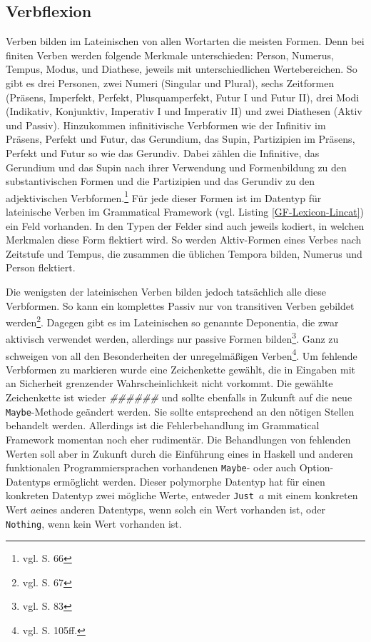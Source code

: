 \subsection{Verbflexion}
\label{subsec:verb}
Verben bilden im Lateinischen von allen Wortarten die meisten Formen. Denn bei finiten Verben werden folgende Merkmale unterschieden: Person, Numerus, Tempus, Modus, und Diathese, jeweils mit unterschiedlichen Wertebereichen. So gibt es drei Personen, zwei Numeri (Singular und Plural), sechs Zeitformen (Präsens, Imperfekt, Perfekt, Plusquamperfekt, Futur I und Futur II), drei Modi (Indikativ, Konjunktiv, Imperativ I und Imperativ II) und zwei Diathesen (Aktiv und Passiv). Hinzukommen infinitivische Verbformen wie der Infinitiv im Präsens, Perfekt und Futur, das Gerundium, das Supin, Partizipien im Präsens, Perfekt und Futur so wie das Gerundiv. Dabei zählen die Infinitive, das Gerundium und das Supin nach ihrer Verwendung und Formenbildung zu den substantivischen Formen und die Partizipien und das Gerundiv zu den adjektivischen Verbformen.\footnote{vgl. \cite{BAYER-LINDAUER1994} S. 66} Für jede dieser Formen ist im Datentyp für lateinische Verben im Grammatical Framework (vgl. Listing \ref{GF-Lexicon-Lincat}) ein Feld vorhanden. In den Typen der Felder sind auch jeweils kodiert, in welchen Merkmalen diese Form flektiert wird. So werden Aktiv-Formen eines Verbes nach Zeitstufe und Tempus, die zusammen die üblichen Tempora bilden, Numerus und Person flektiert.  \par
Die wenigsten der lateinischen Verben bilden jedoch tatsächlich alle diese Verbformen. So kann ein komplettes Passiv nur von transitiven Verben gebildet werden\footnote{vgl. \cite{BAYER-LINDAUER1994} S. 67}. Dagegen gibt es im Lateinischen so genannte Deponentia, die zwar aktivisch verwendet werden, allerdings nur passive Formen bilden\footnote{vgl. \cite{BAYER-LINDAUER1994} S. 83}. Ganz zu schweigen von all den Besonderheiten der unregelmäßigen Verben\footnote{vgl. \cite{BAYER-LINDAUER1994} S. 105ff.}. Um fehlende Verbformen zu markieren wurde eine Zeichenkette gewählt, die in Eingaben mit an Sicherheit grenzender Wahrscheinlichkeit nicht vorkommt. Die gewählte Zeichenkette ist wieder \textit{\#\#\#\#\#\#} und sollte ebenfalls in Zukunft auf die neue \texttt{Maybe}-Methode geändert werden. Sie sollte entsprechend an den nötigen Stellen behandelt werden. Allerdings ist die Fehlerbehandlung im Grammatical Framework momentan noch eher rudimentär. Die Behandlungen von fehlenden Werten soll aber in Zukunft durch die Einführung eines in Haskell und anderen funktionalen Programmiersprachen vorhandenen \texttt{Maybe}- oder auch Option-Datentyps ermöglicht werden. Dieser polymorphe Datentyp hat für einen konkreten Datentyp zwei mögliche Werte, entweder \texttt{Just $a$} mit einem konkreten Wert \texttt{$a$}eines anderen Datentyps, wenn solch ein Wert vorhanden ist, oder \texttt{Nothing}, wenn kein Wert vorhanden ist.\par
